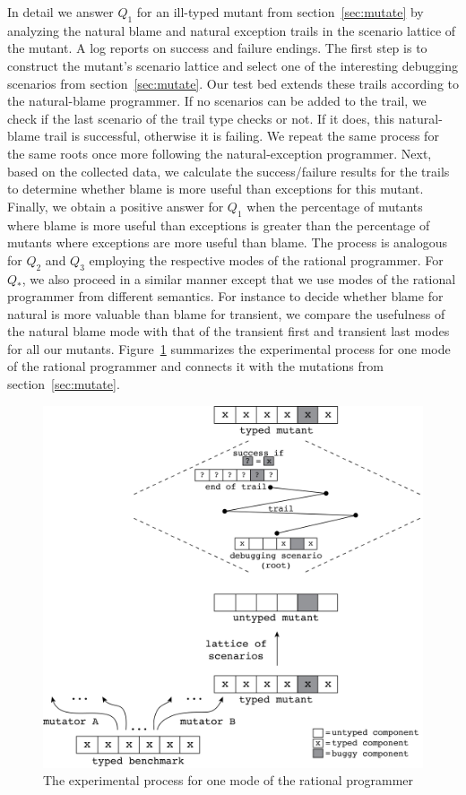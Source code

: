 In detail we answer $Q_1$ for an ill-typed mutant from
section~\ref{sec:mutate} by analyzing the natural blame and
natural exception trails in the scenario lattice of the mutant. A
log reports on success and failure endings.  The first step is to construct the
mutant's scenario lattice and select one of the interesting debugging
scenarios from section~\ref{sec:mutate}.
Our test
bed extends these trails according to the natural-blame programmer.  If no scenarios
can be added to the trail, we check if
the last scenario of the trail type checks or not. If it does, this natural-blame
trail is successful, otherwise it is failing. We repeat the same process for the
same roots once more following the natural-exception programmer. 
Next, based on the collected data, we calculate the
success/failure results for the trails to determine whether blame
is more useful than exceptions for this mutant. Finally, we
obtain a positive answer for
$Q_1$ when the percentage of mutants where blame is more useful
than exceptions is greater than the percentage of mutants where exceptions
are more useful
than blame.  The process is analogous for $Q_2$ and $Q_3$  employing the respective
modes of the rational programmer. For $Q_*$, we also proceed in a similar
manner except that we use modes 
of the rational programmer from different semantics. For instance to
decide whether blame for natural is more valuable than blame for
transient, we compare the usefulness of
the natural blame mode with that of the transient first and transient last
modes for all our mutants. 
Figure~\ref{fig:process} summarizes the
experimental process for one mode of the rational programmer and connects
it with the mutations from section~\ref{sec:mutate}.

\begin{figure}
  \centering
  \includegraphics[scale=0.36]{./Images/process}
  \caption{The experimental process for one mode of the rational
  programmer}
  \label{fig:process}
\end{figure}


